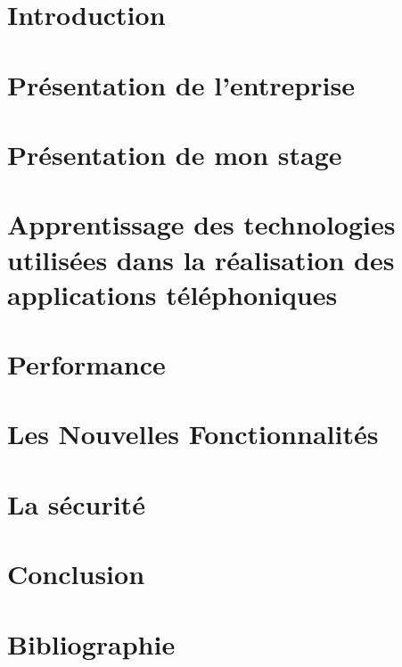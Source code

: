 \documentclass[asi]{picINSA}
\begin{document}
 \couverture{}
 \informationsGenerales{}


 
 \tableofcontents

 \listoffigures

 \chapter{Introduction}
 	
 	
 \chapter{Présentation de l'entreprise}
	

 \chapter{Présentation de mon stage}
	
 
 \chapter{Apprentissage des technologies utilisées dans la réalisation des applications téléphoniques}
 	

 \chapter{Performance}
	

 \chapter{Les Nouvelles Fonctionnalités}
	

 \chapter{La sécurité}
	

 \chapter{Conclusion}
	

 \chapter{Bibliographie}
	

 \newpage
 
\end{document}
